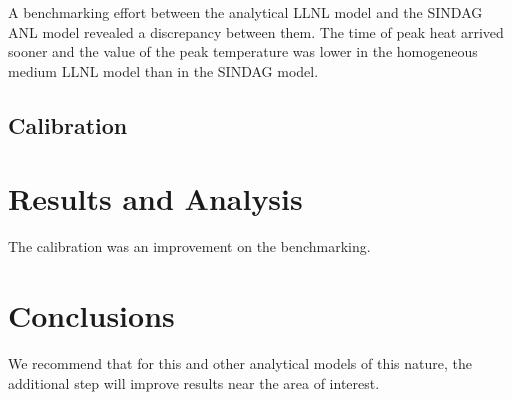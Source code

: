 \documentclass{anstrans}
\begin{document}
A benchmarking effort between the analytical \gls{LLNL} model and the 
\gls{SINDAG} \gls{ANL} model revealed a discrepancy between them. The time of 
peak heat arrived sooner and the value of the peak temperature was lower in the 
homogeneous medium \gls{LLNL} model than in the \gls{SINDAG} model. 





\subsection{Calibration}

\section{Results and Analysis}





The calibration was an improvement on the benchmarking.

\section{Conclusions}

We recommend that for this and other analytical models of this nature, the 
additional step will improve results near the area of interest.



\end{document}
